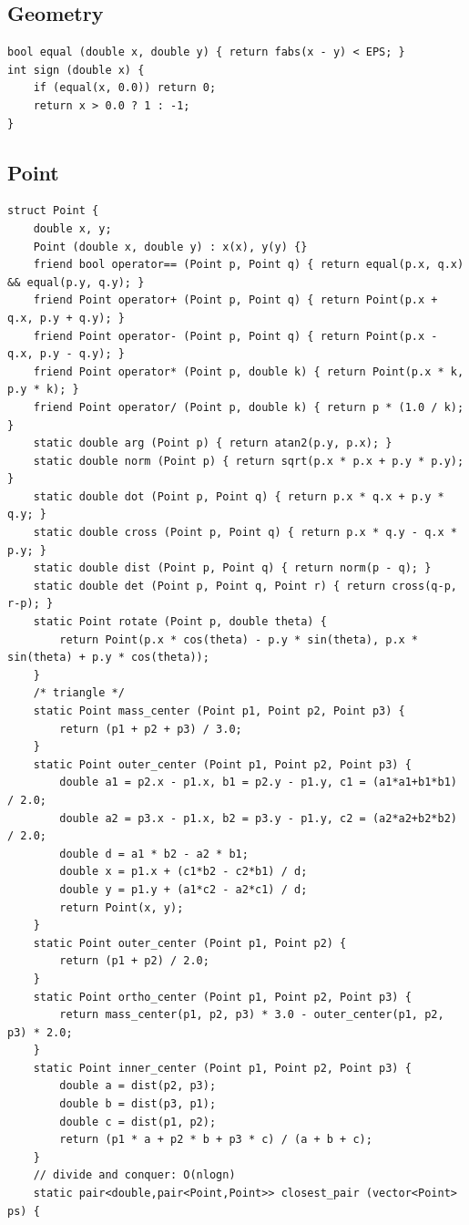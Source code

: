 \documentclass[10pt,letterpaper,landscape]{article}
\begin{document}
\begin{multicols}{2}
\section{Geometry}
\begin{lstlisting}
bool equal (double x, double y) { return fabs(x - y) < EPS; }
int sign (double x) {
	if (equal(x, 0.0)) return 0;
	return x > 0.0 ? 1 : -1;
}
\end{lstlisting}
\subsection{Point}
\begin{lstlisting}
struct Point {
	double x, y;
	Point (double x, double y) : x(x), y(y) {}
	friend bool operator== (Point p, Point q) { return equal(p.x, q.x) && equal(p.y, q.y); }
	friend Point operator+ (Point p, Point q) { return Point(p.x + q.x, p.y + q.y); }
	friend Point operator- (Point p, Point q) { return Point(p.x - q.x, p.y - q.y); }
	friend Point operator* (Point p, double k) { return Point(p.x * k, p.y * k); }
	friend Point operator/ (Point p, double k) { return p * (1.0 / k); }
	static double arg (Point p) { return atan2(p.y, p.x); }
	static double norm (Point p) { return sqrt(p.x * p.x + p.y * p.y); }
	static double dot (Point p, Point q) { return p.x * q.x + p.y * q.y; }
	static double cross (Point p, Point q) { return p.x * q.y - q.x * p.y; }
	static double dist (Point p, Point q) { return norm(p - q); }
	static double det (Point p, Point q, Point r) { return cross(q-p, r-p); }
	static Point rotate (Point p, double theta) {
		return Point(p.x * cos(theta) - p.y * sin(theta), p.x * sin(theta) + p.y * cos(theta));
	}
	/* triangle */
	static Point mass_center (Point p1, Point p2, Point p3) {
		return (p1 + p2 + p3) / 3.0;
	}
	static Point outer_center (Point p1, Point p2, Point p3) {
		double a1 = p2.x - p1.x, b1 = p2.y - p1.y, c1 = (a1*a1+b1*b1) / 2.0;
		double a2 = p3.x - p1.x, b2 = p3.y - p1.y, c2 = (a2*a2+b2*b2) / 2.0;
		double d = a1 * b2 - a2 * b1;
		double x = p1.x + (c1*b2 - c2*b1) / d;
		double y = p1.y + (a1*c2 - a2*c1) / d;
		return Point(x, y);
	}
	static Point outer_center (Point p1, Point p2) {
		return (p1 + p2) / 2.0;
	}
	static Point ortho_center (Point p1, Point p2, Point p3) {
		return mass_center(p1, p2, p3) * 3.0 - outer_center(p1, p2, p3) * 2.0;
	}
	static Point inner_center (Point p1, Point p2, Point p3) {
		double a = dist(p2, p3);
		double b = dist(p3, p1);
		double c = dist(p1, p2);
		return (p1 * a + p2 * b + p3 * c) / (a + b + c);
	}
	// divide and conquer: O(nlogn)
	static pair<double,pair<Point,Point>> closest_pair (vector<Point> ps) {

\end{lstlisting}
\end{multicols}
\end{document}
